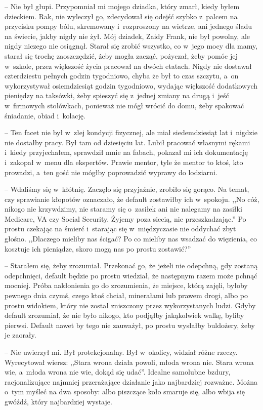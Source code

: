 \documentclass[oneside,polish,11pt,sfheadings]{mwbk}
\begin{document}
-- Nie był głupi. Przypomniał mi mojego dziadka, który zmarł, kiedy byłem
dzieckiem. Rak, nie wyleczył go, zdecydował się odejść szybko z~palcem
na przycisku pompy bólu, skremowany i~rozproszony na wietrze, ani
jednego śladu na świecie, jakby nigdy nie żył. Mój dziadek, Zaidy Frank,
nie był powolny, ale nigdy niczego nie osiągnął. Starał się zrobić
wszystko, co w~jego mocy dla mamy, starał się trochę zaoszczędzić, żeby
mogła zacząć, pożyczał, żeby pomóc jej w~szkole, przez większość życia
pracował na dwóch etatach. Nigdy nie dostawał czterdziestu pełnych
godzin tygodniowo, chyba że był to czas szczytu, a~on wykorzystywał
osiemdziesiąt godzin tygodniowo, wydając większość dodatkowych pieniędzy
na taksówki, żeby spieszyć się z~jednej zmiany na drugą i~jeść w~firmowych stołówkach, ponieważ nie mógł wrócić do domu, żeby spakować
śniadanie, obiad i~kolację.

-- Ten facet nie był w~złej kondycji fizycznej, ale miał siedemdziesiąt
lat i~nigdzie nie dostałby pracy. Był tam od dziesięciu lat. Lubił
pracować własnymi rękami i~kiedy przyjechałem, sprawdził mnie na fabach,
pokazał mi ich dokumentację i~zakopał w~menu dla ekspertów. Prawie
mentor, tyle że mentor to ktoś, kto prowadzi, a~ten gość nie mógłby
poprowadzić wyprawy do lodziarni.

-- Wdaliśmy się w~kłótnię. Zaczęło się przyjaźnie, zrobiło się gorąco. Na
temat, czy sprawianie kłopotów oznaczało, że default zostawiłby ich w~spokoju. ,,No cóż, nikogo nie krzywdzimy, nie staramy się o~zasiłek ani
nie nalegamy na zasiłki Medicare, VA czy Social Security. Żyjemy poza
siecią, nie przeszkadzając.'' Po prostu czekając na śmierć i~starając
się w~międzyczasie nie oddychać zbyt głośno. ,,Dlaczego mieliby nas
ścigać? Po co mieliby nas wsadzać do więzienia, co kosztuje ich
pieniądze, skoro mogą nas po prostu zostawić?''

-- Starałem się, żeby zrozumiał. Przekonać go, że jeżeli nie odepchną,
gdy zostaną odepchnięci, default będzie po prostu wiedział, że następnym
razem może pchnąć mocniej. Próba nakłonienia go do zrozumienia, że
miejsce, którą zajęli, byłoby pewnego dnia czymś, czego ktoś chciał,
minerałami lub prawem drogi, albo po prostu widokiem, który nie został
zniszczony przez wykorzystanych ludzi. Gdyby default zrozumiał, że nie
było nikogo, kto podjąłby jakąkolwiek walkę, byliby pierwsi. Default
nawet by tego nie zauważył, po prostu wysłałby buldożery, żeby je
zaorały.

-- Nie uwierzył mi. Był protekcjonalny. Był w~okolicy, widział różne
rzeczy. Wyrecytował wiersz: ,,Stara wrona działa powoli, młoda wrona
nie. Stara wrona wie, a~młoda wrona nie wie, dokąd się udać''. Idealne
samolubne bzdury, racjonalizujące najmniej przerażające działanie jako
najbardziej rozważne. Można o~tym myśleć na dwa sposoby: albo piszczące
koło smaruje się, albo wbija się gwóźdź, który najbardziej wystaje.
\end{document}
